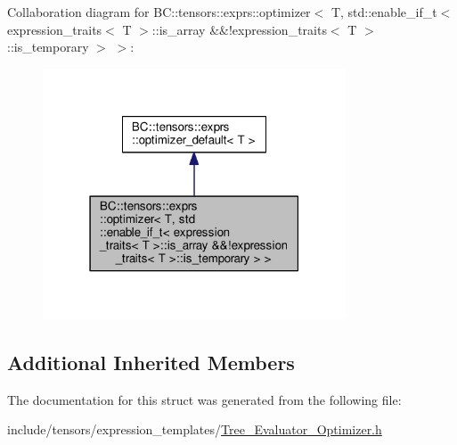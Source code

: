 Collaboration diagram for BC\+:\+:tensors\+:\+:exprs\+:\+:optimizer$<$ T, std\+:\+:enable\+\_\+if\+\_\+t$<$ expression\+\_\+traits$<$ T $>$\+:\+:is\+\_\+array \&\&!expression\+\_\+traits$<$ T $>$\+:\+:is\+\_\+temporary $>$ $>$\+:
\nopagebreak
\begin{figure}[H]
\begin{center}
\leavevmode
\includegraphics[width=255pt]{structBC_1_1tensors_1_1exprs_1_1optimizer_3_01T_00_01std_1_1enable__if__t_3_01expression__traits72236944567afebcb08824e37685d179}
\end{center}
\end{figure}
\subsection*{Additional Inherited Members}


The documentation for this struct was generated from the following file\+:\begin{DoxyCompactItemize}
\item 
include/tensors/expression\+\_\+templates/\hyperlink{Tree__Evaluator__Optimizer_8h}{Tree\+\_\+\+Evaluator\+\_\+\+Optimizer.\+h}\end{DoxyCompactItemize}
